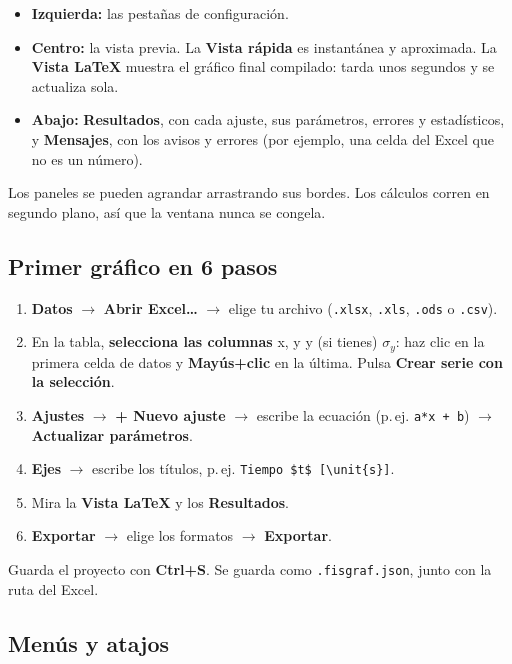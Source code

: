 \documentclass[11pt,a4paper]{article}
\newcommand{\code}[1]{\texttt{#1}}
\newcommand{\bs}{\textbackslash}
\newcommand{\boton}[1]{\textsf{\bfseries #1}}
\begin{document}
\begin{itemize}
  \item \textbf{Izquierda:} las pestañas de configuración.
  \item \textbf{Centro:} la vista previa. La \boton{Vista rápida} es instantánea y aproximada. La \boton{Vista LaTeX} muestra el gráfico final compilado: tarda unos segundos y se actualiza sola.
  \item \textbf{Abajo:} \boton{Resultados}, con cada ajuste, sus parámetros, errores y estadísticos, y \boton{Mensajes}, con los avisos y errores (por ejemplo, una celda del Excel que no es un número).
\end{itemize}

Los paneles se pueden agrandar arrastrando sus bordes. Los cálculos corren en segundo plano, así que la ventana nunca se congela.

\subsection{Primer gráfico en 6 pasos}

\begin{enumerate}
  \item \textbf{Datos} $\rightarrow$ \boton{Abrir Excel…} $\rightarrow$ elige tu archivo (\code{.xlsx}, \code{.xls}, \code{.ods} o \code{.csv}).
  \item En la tabla, \textbf{selecciona las columnas} x, y y (si tienes) $\sigma_y$: haz clic en la primera celda de datos y \textbf{Mayús+clic} en la última. Pulsa \boton{Crear serie con la selección}.
  \item \textbf{Ajustes} $\rightarrow$ \boton{+ Nuevo ajuste} $\rightarrow$ escribe la ecuación (p.\,ej. \code{a*x + b}) $\rightarrow$ \boton{Actualizar parámetros}.
  \item \textbf{Ejes} $\rightarrow$ escribe los títulos, p.\,ej. \code{Tiempo \$t\$ [\bs unit\{s\}]}.
  \item Mira la \boton{Vista LaTeX} y los \boton{Resultados}.
  \item \textbf{Exportar} $\rightarrow$ elige los formatos $\rightarrow$ \boton{Exportar}.
\end{enumerate}

Guarda el proyecto con \textbf{Ctrl+S}. Se guarda como \code{.fisgraf.json}, junto con la ruta del Excel.

\subsection{Menús y atajos}
\end{document}
